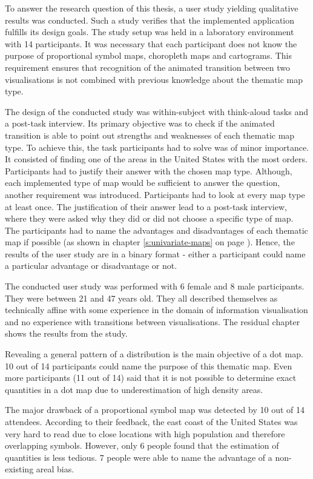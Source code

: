 To answer the research question of this thesis, a user study yielding qualitative results was conducted. Such a study verifies that the implemented application fulfills its design goals.
The study setup was held in a laboratory environment with 14 participants. It was necessary that each participant does not know the purpose of proportional symbol maps, choropleth maps and cartograms. This requirement ensures that recognition of the animated transition between two visualisations is not combined with previous knowledge about the thematic map type.

The design of the conducted study was within-subject with think-aloud tasks and a post-task interview. Its primary objective was to check if the animated transition is able to point out strengths and weaknesses of each thematic map type. To achieve this, the task participants had to solve was of minor importance. It consisted of finding one of the areas in the United States with the most orders. Participants had to justify their answer with the chosen map type. Although, each implemented type of map would be sufficient to answer the question, another requirement was introduced. Participants had to look at every map type at least once. The justification of their answer lead to a post-task interview, where they were asked why they did or did not choose a specific type of map. The participants had to name the advantages and disadvantages of each thematic map if possible (as shown in chapter \ref{s:univariate-maps} on page \pageref{s:univariate-maps}). Hence, the results of the user study are in a binary format - either a participant could name a particular advantage or disadvantage or not.

The conducted user study was performed with 6 female and 8 male participants. They were between 21 and 47 years old. They all described themselves as technically affine with some experience in the domain of information visualisation and no experience with transitions between visualisations. The residual chapter shows the results from the study.

Revealing a general pattern of a distribution is the main objective of a dot map. 10 out of 14 participants could name the purpose of this thematic map. Even more participants (11 out of 14) said that it is not possible to determine exact quantities in a dot map due to underestimation of high density areas.

The major drawback of a proportional symbol map was detected by 10 out of 14 attendees. According to their feedback, the east coast of the United States was very hard to read due to close locations with high population and therefore overlapping symbols. However, only 6 people found that the estimation of quantities is less tedious. 7 people were able to name the advantage of a non-existing areal bias.

